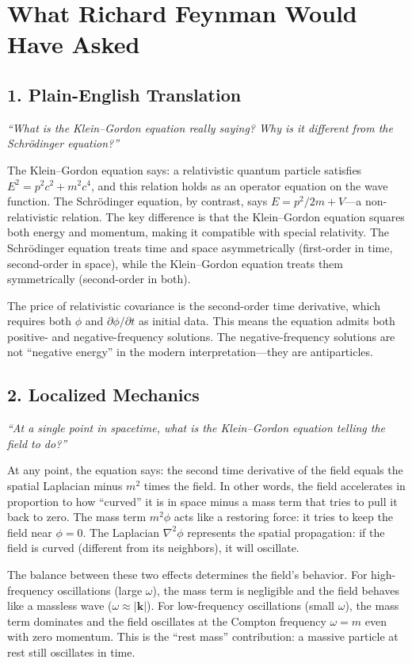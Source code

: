\section*{What Richard Feynman Would Have Asked}

\subsection*{1. Plain-English Translation}
\textit{``What is the Klein--Gordon equation really saying? Why is it different from the Schr\"odinger equation?''}

The Klein--Gordon equation says: a relativistic quantum particle satisfies $E^2 = p^2c^2 + m^2c^4$, and this relation holds as an operator equation on the wave function. The Schr\"odinger equation, by contrast, says $E = p^2/2m + V$---a non-relativistic relation. The key difference is that the Klein--Gordon equation squares both energy and momentum, making it compatible with special relativity. The Schr\"odinger equation treats time and space asymmetrically (first-order in time, second-order in space), while the Klein--Gordon equation treats them symmetrically (second-order in both).

The price of relativistic covariance is the second-order time derivative, which requires both $\phi$ and $\partial\phi/\partial t$ as initial data. This means the equation admits both positive- and negative-frequency solutions. The negative-frequency solutions are not ``negative energy'' in the modern interpretation---they are antiparticles.

\subsection*{2. Localized Mechanics}
\textit{``At a single point in spacetime, what is the Klein--Gordon equation telling the field to do?''}

At any point, the equation says: the second time derivative of the field equals the spatial Laplacian minus $m^2$ times the field. In other words, the field accelerates in proportion to how ``curved'' it is in space minus a mass term that tries to pull it back to zero. The mass term $m^2\phi$ acts like a restoring force: it tries to keep the field near $\phi = 0$. The Laplacian $\nabla^2\phi$ represents the spatial propagation: if the field is curved (different from its neighbors), it will oscillate.

The balance between these two effects determines the field's behavior. For high-frequency oscillations (large $\omega$), the mass term is negligible and the field behaves like a massless wave ($\omega \approx |\mathbf{k}|$). For low-frequency oscillations (small $\omega$), the mass term dominates and the field oscillates at the Compton frequency $\omega = m$ even with zero momentum. This is the ``rest mass'' contribution: a massive particle at rest still oscillates in time.

